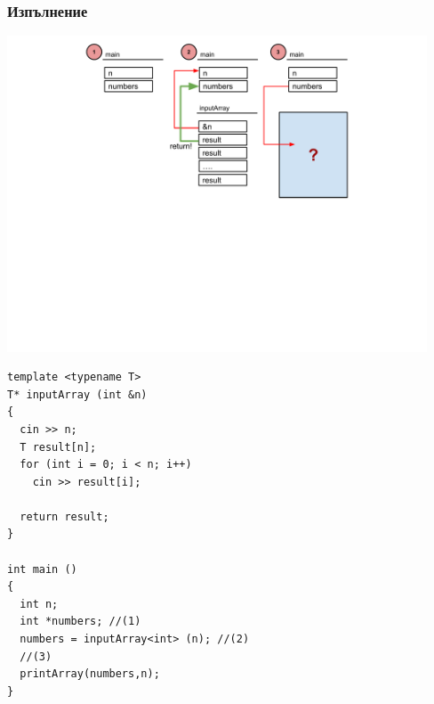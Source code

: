 \documentclass{beamer}
\begin{document}
\begin{frame}[fragile]
\frametitle{Изпълнение}


\includegraphics[width=12.5cm]{images/stack}

\vspace{-200px}
\begin{flushleft}
\begin{lstlisting}
template <typename T>
T* inputArray (int &n)
{ 
  cin >> n;
  T result[n];
  for (int i = 0; i < n; i++)
    cin >> result[i];

  return result;
}

int main ()
{
  int n;
  int *numbers; //(1)
  numbers = inputArray<int> (n); //(2)
  //(3) 
  printArray(numbers,n);
}

\end{lstlisting}  
\end{flushleft}

\end{frame}
\end{document}
